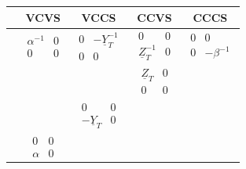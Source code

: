 {	\renewcommand{\arraystretch}{1.2}
	\arraycolsep=1.3pt
\begin{tabular}{|c|c|c|c|c|}
	\hline
	& VCVS& VCCS & CCVS & CCCS\\
	\hline
	[\underline{A}]& $\begin{matrix}
		\alpha^{-1} & 0 \\
		0 & 0
	\end{matrix}$ & $\begin{matrix}
		0 & -\underline{Y}_T^{-1} \\
		0 & 0
	\end{matrix}$ & $\begin{matrix}
	0 & 0 \\
\underline{Z}_T^{-1} & 0
	\end{matrix}$ & $\begin{matrix}
	0 & 0 \\
	0 & -\beta^{-1}
	\end{matrix}$\\
	\hline
	[\underline{Z}]& & & $\begin{matrix}
		\underline{Z}_T & 0 \\
		0 & 0
	\end{matrix}$ &\\
	\hline
	[\underline{Y}]& & $\begin{matrix}
		0 & 0 \\
		-\underline{Y}_T & 0
	\end{matrix}$ & & \\
	\hline
	[\underline{H]}& & & & $\begin{matrix}
		0 & 0 \\
		-\beta & 0
	\end{matrix}$\\
	\hline
	[\underline{C}]& $\begin{matrix}
		0 & 0 \\
		\alpha & 0
	\end{matrix}$ & & &\\
	\hline
\end{tabular} }
